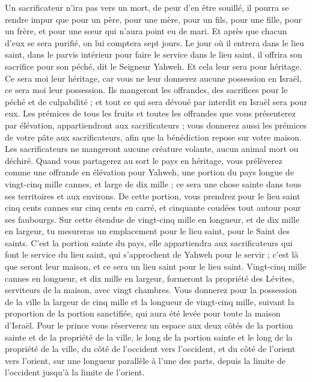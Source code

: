 \begin{multicols}{2}
Un sacrificateur n’ira pas vers un mort, de peur d'en être souillé, il pourra se rendre impur que pour un père, pour une mère, pour un fils, pour une fille, pour un frère, et pour une sœur qui n'aura point eu de mari.
Et après que chacun d'eux se sera purifié, on lui comptera sept jours.
Le jour où il entrera dans le lieu saint, dans le parvis intérieur pour faire le service dans le lieu saint, il offrira son sacrifice pour son péché, dit le Seigneur Yahweh.
Et cela leur sera pour héritage. Ce sera moi leur héritage, car vous ne leur donnerez aucune possession en Israël, ce sera moi leur possession.
Ils mangeront les offrandes, des sacrifices pour le péché et de culpabilité ; et tout ce qui sera dévoué par interdit en Israël sera pour eux.
Les prémices de tous les fruits et toutes les offrandes que vous présenterez par élévation, appartiendront aux sacrificateurs ; vous donnerez aussi les prémices de votre pâte aux sacrificateurs, afin que la bénédiction repose sur votre maison.
Les sacrificateurs ne mangeront aucune créature volante, aucun animal mort ou déchiré.
\VerseOne{}Quand vous partagerez au sort le pays en héritage, vous prélèverez comme une offrande en élévation pour Yahweh, une portion du pays longue de vingt-cinq mille cannes, et large de dix mille ; ce sera une chose sainte dans tous ses territoires et aux environs.
De cette portion, vous prendrez pour le lieu saint cinq cents cannes sur cinq cents en carré, et cinquante coudées tout autour pour ses faubourgs.
Sur cette étendue de vingt-cinq mille en longueur, et de dix mille en largeur, tu mesureras un emplacement pour le lieu saint, pour le Saint des saints.
C’est la portion sainte du pays, elle appartiendra aux sacrificateurs qui font le service du lieu saint, qui s’approchent de Yahweh pour le servir ; c’est là que seront leur maison, et ce sera un lieu saint pour le lieu saint.
Vingt-cinq mille cannes en longueur, et dix mille en largeur, formeront la propriété des Lévites, serviteurs de la maison, avec vingt chambres.
Vous donnerez pour la possession de la ville la largeur de cinq mille et la longueur de vingt-cinq mille, suivant la proportion de la portion sanctifiée, qui aura été levée pour toute la maison d'Israël.
Pour le prince vous réserverez un espace aux deux côtés de la portion sainte et de la propriété de la ville, le long de la portion sainte et le long de la propriété de la ville, du côté de l’occident  vers l’occident, et du côté de l’orient vers l’orient, sur une longueur parallèle à l’une des parts, depuis la limite de l’occident jusqu’à la limite de l’orient.

\end{multicols}
